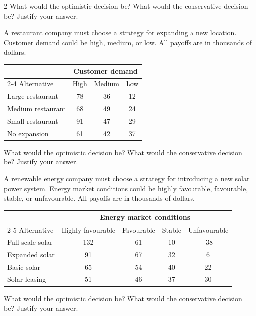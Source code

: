 \begin{multicols}{2}
		What would the optimistic decision be? What would the conservative decision be? Justify your answer.
		
		\columnbreak
		
		A restaurant company must choose a strategy for expanding a new location. Customer demand could be high, medium, or low. All payoffs are in thousands of dollars.
		
		\begin{center}
			\renewcommand{\arraystretch}{1.3}
			\small
			\begin{tabular}{lccc}
				\toprule
				& \multicolumn{3}{c}{Customer demand} \\
				\cmidrule(lr){2-4}
				Alternative & High & Medium & Low \\
				\midrule
				Large restaurant & 78 & 36 & 12 \\
				Medium restaurant & 68 & 49 & 24 \\
				Small restaurant & 91 & 47 & 29 \\
				No expansion & 61 & 42 & 37 \\
				\bottomrule
			\end{tabular}
		\end{center}
		
		What would the optimistic decision be? What would the conservative decision be? Justify your answer.
		
	\end{multicols}
	
	A renewable energy company must choose a strategy for introducing a new solar power system. Energy market conditions could be highly favourable, favourable, stable, or unfavourable. All payoffs are in thousands of dollars.
	
	\begin{center}
		\renewcommand{\arraystretch}{1.3}
		\small
		\begin{tabular}{lcccc}
			\toprule
			& \multicolumn{4}{c}{Energy market conditions} \\
			\cmidrule(lr){2-5}
			Alternative & Highly favourable & Favourable & Stable & Unfavourable \\
			\midrule
			Full-scale solar & 132 & 61 & 10 & -38 \\
			Expanded solar & 91 & 67 & 32 & 6 \\
			Basic solar & 65 & 54 & 40 & 22 \\
			Solar leasing & 51 & 46 & 37 & 30 \\
			\bottomrule
		\end{tabular}
	\end{center}

	What would the optimistic decision be? What would the conservative decision be? Justify your answer.


